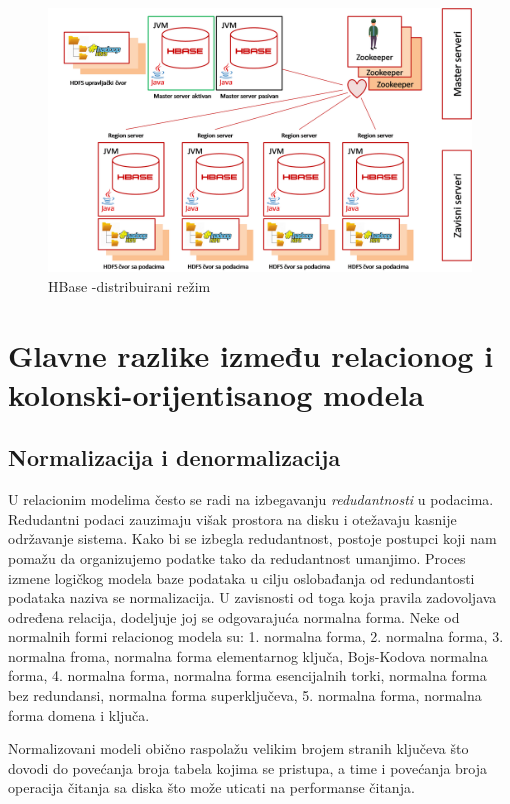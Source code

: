 \documentclass[12pt,oneside]{memoir}
\begin{document}
\begin{figure}[!ht]
  \centering
  \includegraphics[width=1\textwidth]{hbase-distributed.png}
  \caption{HBase -distribuirani režim}
  \label{fig:grafikon}
\end{figure}


\pagebreak

\section{Glavne razlike između relacionog i kolonski-orijentisanog modela}


\subsection{Normalizacija i denormalizacija}

U relacionim modelima često se radi na izbegavanju \textit{redudantnosti} u podacima. Redudantni podaci zauzimaju višak prostora na disku i otežavaju kasnije održavanje sistema. Kako bi se izbegla redudantnost, postoje postupci koji nam pomažu da organizujemo podatke tako da redudantnost umanjimo. Proces izmene logičkog modela baze podataka u cilju oslobađanja od redundantosti podataka naziva se normalizacija. U zavisnosti od toga koja pravila zadovoljava određena relacija, dodeljuje joj se odgovarajuća normalna forma. Neke od normalnih formi relacionog modela su: 1. normalna forma, 2. normalna forma, 3. normalna froma, normalna forma elementarnog ključa, Bojs-Kodova normalna forma, 4. normalna forma, normalna forma esencijalnih torki, normalna forma bez redundansi, normalna forma superključeva, 5. normalna forma, normalna forma domena i ključa.

Normalizovani modeli obično raspolažu velikim brojem stranih ključeva što dovodi do povećanja broja tabela kojima se pristupa, a time i povećanja broja operacija čitanja sa diska što može uticati na performanse čitanja.
\end{document}

